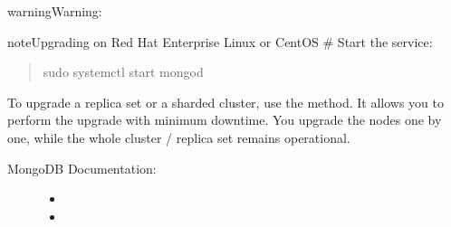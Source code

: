 \documentclass[letterpaper,10pt,english]{sphinxmanual}
\begin{document}
\begin{sphinxadmonition}{warning}{Warning:}
\begin{sphinxadmonition}{note}{Upgrading on Red Hat Enterprise Linux or CentOS}
\sphinxAtStartPar
\# Start the  service:
\begin{quote}

\begin{sphinxVerbatim}[commandchars=\\\{\}]
\PYGZdl{} sudo systemctl start mongod
\end{sphinxVerbatim}
\end{quote}
\end{sphinxadmonition}
\end{sphinxadmonition}

\sphinxAtStartPar
To upgrade a replica set or a sharded cluster, use the {\hyperref[\detokenize{glossary:term-Rolling-restart}]{}} method. It allows you to perform the upgrade with minimum downtime. You upgrade the nodes one by one, while the whole cluster / replica set remains operational.


\nopagebreak

\begin{description}
\item[{MongoDB Documentation:}] \leavevmode\begin{itemize}
\item {} 
\sphinxAtStartPar
{}

\item {} 
\sphinxAtStartPar
{}

\end{itemize}

\end{description}
\end{document}
